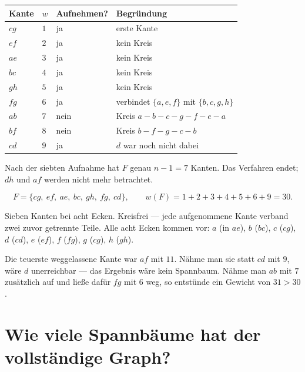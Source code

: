 \begin{merksatz}
\begin{center}
{\small
\renewcommand{\arraystretch}{1.38}
\begin{tabular}{@{}P{1.3cm}P{0.9cm}P{2.2cm}P{3.2cm}@{}}
\toprule
\textbf{Kante} & \textbf{$w$} & \textbf{Aufnehmen?} & \textbf{Begründung}\\
\midrule
$cg$ & $1$ & \textcolor{gruen}{ja} & erste Kante\\
$ef$ & $2$ & \textcolor{gruen}{ja} & kein Kreis\\
$ae$ & $3$ & \textcolor{gruen}{ja} & kein Kreis\\
$bc$ & $4$ & \textcolor{gruen}{ja} & kein Kreis\\
$gh$ & $5$ & \textcolor{gruen}{ja} & kein Kreis\\
$fg$ & $6$ & \textcolor{gruen}{ja} & verbindet $\{a,e,f\}$ mit $\{b,c,g,h\}$\\
$ab$ & $7$ & \textcolor{akzent}{nein} & Kreis $a\!-\!b\!-\!c\!-\!g\!-\!f\!-\!e\!-\!a$\\
$bf$ & $8$ & \textcolor{akzent}{nein} & Kreis $b\!-\!f\!-\!g\!-\!c\!-\!b$\\
$cd$ & $9$ & \textcolor{gruen}{ja} & $d$ war noch nicht dabei\\
\bottomrule
\end{tabular}}
\end{center}

Nach der siebten Aufnahme hat $F$ genau $n-1 = 7$ Kanten. Das Verfahren endet; $dh$ und $af$ werden nicht mehr betrachtet.

\[ F = \{cg,\ ef,\ ae,\ bc,\ gh,\ fg,\ cd\}, \qquad w(F) = 1+2+3+4+5+6+9 = 30 . \]

Sieben Kanten bei acht Ecken. \checkmark\quad Kreisfrei --- jede aufgenommene Kante verband zwei zuvor getrennte Teile. \checkmark\quad Alle acht Ecken kommen vor: $a$ (in $ae$), $b$ ($bc$), $c$ ($cg$), $d$ ($cd$), $e$ ($ef$), $f$ ($fg$), $g$ ($cg$), $h$ ($gh$). \checkmark

Die teuerste weggelassene Kante war $af$ mit $11$. Nähme man sie statt $cd$ mit $9$, wäre $d$ unerreichbar --- das Ergebnis wäre kein Spannbaum. Nähme man $ab$ mit $7$ zusätzlich auf und ließe dafür $fg$ mit $6$ weg, so entstünde ein Gewicht von $31 > 30$.
\end{merksatz}

\section{Wie viele Spannbäume hat der vollständige Graph?}


